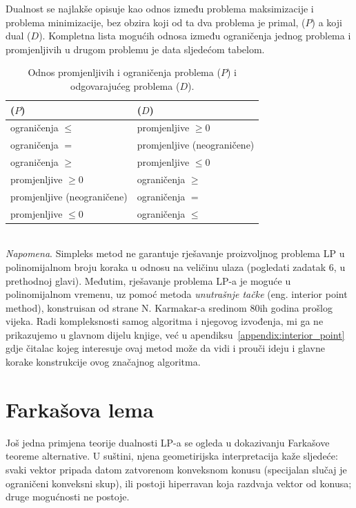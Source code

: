 \documentclass[a4paper, utf8, 11pt, colorlinks]{book}
\theoremstyle{definition}
\begin{document}
Dualnost se najlakše opisuje kao odnos između problema maksimizacije i problema minimizacije, bez obzira koji od ta dva problema je primal, ($P$) a koji   dual ($D$). 
Kompletna lista mogućih odnosa između ograničenja
jednog problema i promjenljivih u drugom problemu je data sljedećom tabelom.
\begin{table}[!ht]
	\centering
    \begin{tabular}{l|l}
      ($P$) & ($D$) \\ \hline
      ograničenja $\leq$  & promjenljive $\geq 0$ \\
      ograničenja $=$     & promjenljive (neograničene) \\
      ograničenja $\geq$  & promjenljive $\leq 0$ \\
      promjenljive $\geq 0$    & ograničenja $\geq$ \\
      promjenljive (neograničene) & ograničenja $=$ \\
      promjenljive $\leq 0$         & ograničenja $\leq$ \\ \hline
    \end{tabular}
  
    \caption{Odnos promjenljivih i ograničenja problema ($P$) i odgovarajućeg problema ($D$).}  \label{tab:primal-dual-relation}
\end{table}
\\
\textit{Napomena}. Simpleks metod ne garantuje   rješavanje proizvoljnog problema LP u polinomijalnom broju koraka u odnosu na veličinu ulaza (pogledati zadatak 6, u prethodnoj glavi). %
Međutim, rješavanje problema LP-a je moguće u polinomijalnom vremenu, uz pomoć metoda \emph{unutrašnje tačke} (eng. interior point method), konstruisan od strane N. Karmakar-a sredinom 80ih godina prošlog vijeka. Radi kompleksnosti samog algoritma i njegovog izvođenja, mi ga ne prikazujemo u glavnom dijelu knjige, već u apendiksu~\ref{appendix:interior_point} gdje čitalac kojeg interesuje ovaj metod može da vidi i prouči ideju i glavne korake konstrukcije ovog značajnog algoritma. 

\section{Farkašova lema}
Još jedna primjena teorije dualnosti LP-a se ogleda u dokazivanju Farkašove teoreme alternative. U suštini, njena geometirijska interpretacija kaže sljedeće: svaki vektor pripada datom zatvorenom konveksnom konusu (specijalan slučaj je ograničeni konveksni skup), ili postoji hiperravan koja razdvaja vektor od konusa; druge mogućnosti ne postoje. 
\end{document}
